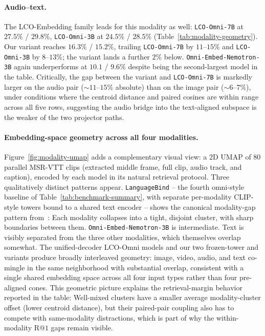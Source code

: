 \paragraph{Audio--text.}
The LCO-Embedding family leads for this modality as well: \texttt{LCO-Omni-7B} at $27.5\%$ / $29.8\%$, \texttt{LCO-Omni-3B} at $24.5\%$ / $28.5\%$ (Table~\ref{tab:modality-geometry}).
Our \omniSmall{} variant reaches $16.3\%$ / $15.2\%$, trailing \texttt{LCO-Omni-7B} by $11$--$15\%$ and \texttt{LCO-Omni\allowbreak -3B} by $8$--$13\%$; the \omniNano{} variant lands a further $2\%$ below.
\texttt{Omni-Embed-Nemotron-3B} again underperforms at $10.1$ / $9.6\%$ despite being the second-largest model in the table.
Critically, the gap between the \omniSmall{} variant and \texttt{LCO-Omni-7B} is markedly larger on the audio pair ($\sim$$11$--$15\%$ absolute) than on the image pair ($\sim$$6$--$7\%$), under conditions where the centroid distance and paired cosines are within range across all five rows, suggesting the audio bridge into the text-aligned subspace is the weaker of the two projector paths.

\paragraph{Embedding-space geometry across all four modalities.}
Figure~\ref{fig:modality-umap} adds a complementary visual view: a 2D UMAP of $80$ parallel MSR-VTT clips (extracted middle frame, full clip, audio track, and caption), encoded by each model in its natural retrieval protocol.
Three qualitatively distinct patterns appear.
\texttt{LanguageBind} -- the fourth omni-style baseline of Table~\ref{tab:benchmark-summary}, with separate per-modality CLIP-style towers bound to a shared text encoder -- shows the canonical modality-gap pattern from~\cite{modality-gap}: Each modality collapses into a tight, disjoint cluster, with sharp boundaries between them.
\texttt{Omni-Embed-Nemotron-3B} is intermediate. Text is visibly separated from the three other modalities, which themselves overlap somewhat.
The unified-decoder LCO-Omni models and our two frozen-tower \omniSmall{} and \omniNano{} variants produce broadly interleaved geometry: image, video, audio, and text co-mingle in the same neighborhood with substantial overlap, consistent with a single shared embedding space across all four input types rather than four pre-aligned cones.
This geometric picture explains the retrieval-margin behavior reported in the table: Well-mixed clusters have a smaller average modality-cluster offset (lower centroid distance), but their paired-pair coupling also has to compete with same-modality distractions, which is part of why the within-modality R@$1$ gaps remain visible.

